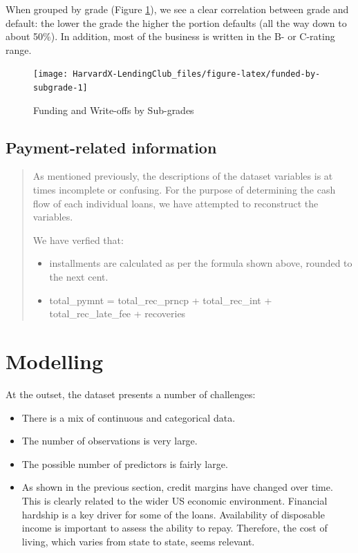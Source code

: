 \documentclass[11pt,]{report}
\begin{document}
When grouped by grade (Figure \ref{fig:funded-by-subgrade}), we see a clear correlation between grade and default: the lower the grade the higher the portion defaults (all the way down to about 50\%). In addition, most of the business is written in the B- or C-rating range.

\begin{figure}

{\centering \texttt{[image: HarvardX-LendingClub\_files/figure-latex/funded-by-subgrade-1]} 

}

\caption{Funding and Write-offs by Sub-grades}\label{fig:funded-by-subgrade}
\end{figure}

\hypertarget{payment-related-information}{%
\section{Payment-related information}\label{payment-related-information}}

\begin{quote}
As mentioned previously, the descriptions of the dataset variables is at times incomplete or confusing. For the purpose of determining the cash flow of each individual loans, we have attempted to reconstruct the variables.

We have verfied that:

\begin{itemize}
\item
  installments are calculated as per the formula shown above, rounded to the next cent.
\item
  total\_pymnt = total\_rec\_prncp + total\_rec\_int + total\_rec\_late\_fee + recoveries
\end{itemize}
\end{quote}

\hypertarget{modelling}{%
\chapter{Modelling}\label{modelling}}

At the outset, the dataset presents a number of challenges:

\begin{itemize}
\item
  There is a mix of continuous and categorical data.
\item
  The number of observations is very large.
\item
  The possible number of predictors is fairly large.
\item
  As shown in the previous section, credit margins have changed over time. This is clearly related to the wider US economic environment. Financial hardship is a key driver for some of the loans. Availability of disposable income is important to assess the ability to repay. Therefore, the cost of living, which varies from state to state, seems relevant.
\end{itemize}
\end{document}
